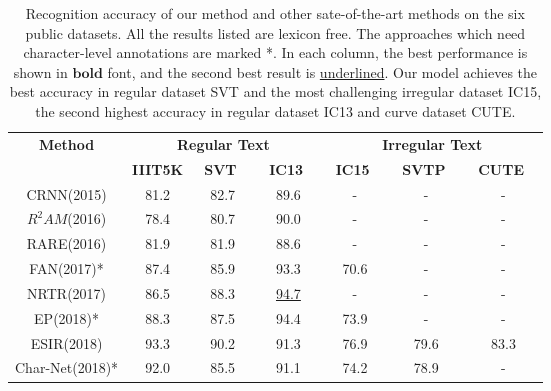 \documentclass[runningheads]{llncs}
\begin{document}
\begin{table}[]
\vspace{-0.3cm} 
\caption{Recognition accuracy of our method and other sate-of-the-art methods on the six public datasets. All the results listed are lexicon free. The approaches which need character-level annotations are marked *. In each column, the best performance is shown in $\mathbf{bold}$ font, and the second best result is  \underline{underlined}. Our model achieves the best accuracy in regular dataset SVT and the most challenging irregular dataset IC15, the second highest accuracy in regular dataset IC13 and curve dataset CUTE.}
\label{tab2}
\centering
\begin{tabular}{|c|c|c|c|c|c|c|}
\hline
\multirow{2}{*}{\textbf{Method}} & \multicolumn{3}{c|}{\textbf{Regular Text}}     & \multicolumn{3}{c|}{\textbf{Irregular Text}}  \\ \cline{2-7} 
                                 & \textbf{IIIT5K} & \ \textbf{SVT} \  & \ \textbf{IC13} \  & \ \textbf{IC15} \ &  \ \textbf{SVTP} \ &  \ \textbf{CUTE} \ \\ \hline
CRNN(2015)\cite{shi2016end}                     &   81.2           &  82.7          &  89.6         & -             & -             & -             \\
$R^2AM$(2016)\cite{lee2016recursive}         & 78.4            & 80.7         & 90.0          &  -          & -         &  -          \\
RARE(2016)\cite{shi2016robust}         & 81.9            & 81.9         & 88.6          &  -          & -         &  -          \\
FAN(2017)\cite{cheng2017focusing}*                    & 87.4            & 85.9         & 93.3          &  70.6          & -         &  -          \\
NRTR(2017)\cite{sheng2019nrtr}                     & 86.5            & 88.3         &  \underline{94.7}          & -             & -             & -             \\
EP(2018)\cite{bai2018edit}*         & 88.3            & 87.5         & 94.4          &  73.9          & -         &  -          \\
ESIR(2018)\cite{zhan2019esir}                    & 93.3            & 90.2         & 91.3          & 76.9          & 79.6          & 83.3          \\
Char-Net(2018)\cite{liu2018char}*                 & 92.0            & 85.5         & 91.1          & 74.2          & 78.9          & -             \\

\end{tabular}
\end{table}
\end{document}
